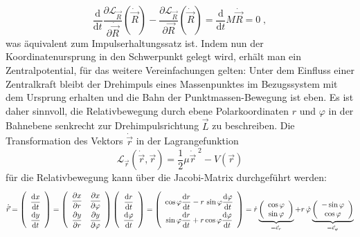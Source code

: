 \documentclass[9pt]{report}
\begin{document}
\begin{equation}
\frac{\mathrm{d}}{\mathrm{d}t}\frac{\partial\mathcal{L}_{\vec{R}}}{\partial\dot{\vec{R}}}(\dot{\vec{R}})-\frac{\partial\mathcal{L}_{\vec{R}}}{\partial\vec{R}}(\dot{\vec{R}})=\frac{\mathrm{d}}{\mathrm{d}t}M\dot{\vec{R}}=0\;,
\end{equation}
was äquivalent zum Impulserhaltungssatz ist. Indem nun der Koordinatenursprung in den Schwerpunkt gelegt wird, erhält man ein Zentralpotential, für das weitere Vereinfachungen gelten: Unter dem Einfluss einer Zentralkraft bleibt der Drehimpuls eines Massenpunktes im Bezugssystem mit dem Ursprung erhalten und die Bahn der Punktmassen-Bewegung ist eben. Es ist daher sinnvoll, die Relativbewegung durch ebene Polarkoordinaten $r$ und $\varphi$ in der Bahnebene senkrecht zur Drehimpulsrichtung $\vec{L}$ zu beschreiben. Die Transformation des Vektors $\dot{\vec{r}}$ in der Lagrangefunktion
\begin{equation}
\mathcal{L}_{\vec{r}}(\dot{\vec{r}},\vec{r})=\frac{1}{2}\mu\dot{\vec{r}}^{\;2}-V(\vec{r})
\end{equation}
für die Relativbewegung kann über die Jacobi-Matrix durchgeführt werden:
\begin{equation}
\dot{\vec{r}}=\renewcommand{\arraystretch}{2.0}\left(\begin{array}{c}\displaystyle\frac{\mathrm{d}x}{\mathrm{d} t}\\\displaystyle\frac{\mathrm{d}y}{\mathrm{d}t}\end{array}\right)
=\renewcommand{\arraystretch}{2.0}
\left(\begin{array}{cc}\displaystyle\frac{\partial x}{\partial r} & \displaystyle\frac{\partial x}{\partial\varphi}\\\displaystyle\frac{\partial y}{\partial r} &\displaystyle\frac{\partial y}{\partial\varphi}\\\end{array}\right)
\renewcommand{\arraystretch}{2.0}\left(\begin{array}{c}\displaystyle\frac{\mathrm{d}r}{\mathrm{d} t}\\\displaystyle\frac{\mathrm{d}\varphi}{\mathrm{d}t}\end{array}\right)
=\renewcommand{\arraystretch}{2.0}\left(\begin{array}{c}\displaystyle\cos\varphi\frac{\mathrm{d}r}{\mathrm{d} t}-r\,\sin\varphi\frac{\mathrm{d}\varphi}{\mathrm{d}t}\\\sin\varphi\displaystyle\frac{\mathrm{d}r}{\mathrm{d}t}+r\cos\varphi\frac{\mathrm{d}\varphi}{\mathrm{d}t}\end{array}\right)
=\dot{r}\underbrace{\renewcommand{\arraystretch}{1.0}\left(\begin{array}{c}\cos\varphi\\\sin\varphi\end{array}\right)}_{=\vec{e}_r}+r\,\dot{\varphi}\underbrace{\renewcommand{\arraystretch}{1.0}\left(\begin{array}{c}-\sin\varphi\\\cos\varphi\end{array}\right)}_{=\vec{e}_{\varphi}}\notag
\end{equation}
\end{document}
